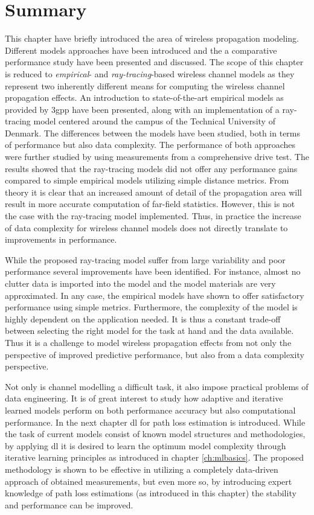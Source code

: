 \section{Summary}
This chapter have briefly introduced the area of wireless propagation modeling. Different models approaches have been introduced and the a comparative performance study have been presented and discussed. The scope of this chapter is reduced to \emph{empirical}- and \emph{ray-tracing}-based wireless channel models as they represent two inherently different means for computing the wireless channel propagation effects. An introduction to state-of-the-art empirical models as provided by \gls{3gpp} have been presented, along with an implementation of a ray-tracing model centered around the campus of the Technical University of Denmark. The differences between the models have been studied, both in terms of performance but also data complexity. The performance of both approaches were further studied by using measurements from a comprehensive drive test. The results showed that the ray-tracing models did not offer any performance gains compared to simple empirical models utilizing simple distance metrics. From theory it is clear that an increased amount of detail of the propagation area will result in more accurate computation of far-field statistics. However, this is not the case with the ray-tracing model implemented. Thus, in practice the increase of data complexity for wireless channel models does not directly translate to improvements in performance. 

While the proposed ray-tracing model suffer from large variability and poor performance several improvements have been identified. For instance, almost no clutter data is imported into the model and the model materials are very approximated. In any case, the empirical models have shown to offer satisfactory performance using simple metrics. Furthermore, the complexity of the model is highly dependent on the application needed. It is thus a constant trade-off between selecting the right model for the task at hand and the data available. Thus it is a challenge to model wireless propagation effects from not only the perspective of improved predictive performance, but also from a data complexity perspective. 

Not only is channel modelling a difficult task, it also impose practical problems of data engineering. It is of great interest to study how adaptive and iterative learned models perform on both performance accuracy but also computational performance. In the next chapter \gls{dl} for path loss estimation is introduced. While the task of current models consist of known model structures and methodologies, by applying \gls{dl} it is desired to learn the optimum model complexity through iterative learning principles as introduced in chapter \ref{ch:mlbasics}. The proposed methodology is shown to be effective in utilizing a completely data-driven approach of obtained measurements, but even more so, by introducing expert knowledge of path loss estimations (as introduced in this chapter) the stability and performance can be improved.